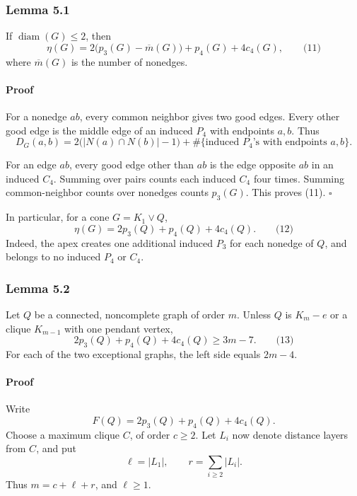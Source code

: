 \documentclass[
  11pt,
  a4paper,
]{article}
\newcounter{none} %
\begin{document}
\subsubsection{Lemma 5.1}\label{lemma-5.1}

If \(\operatorname{diam}(G)\le2\), then \[
\eta(G)
=
2\bigl(p_3(G)-\overline m(G)\bigr)
+p_4(G)+4c_4(G),
\qquad\text{(11)}
\] where \(\overline m(G)\) is the number of nonedges.

\paragraph{Proof}\label{proof-5}

For a nonedge \(ab\), every common neighbor gives two good edges. Every
other good edge is the middle edge of an induced \(P_4\) with endpoints
\(a,b\). Thus \[
D_G(a,b)
=
2\bigl(|N(a)\cap N(b)|-1\bigr)
+\#\{\text{induced \(P_4\)'s with endpoints \(a,b\)}\}.
\]

For an edge \(ab\), every good edge other than \(ab\) is the edge
opposite \(ab\) in an induced \(C_4\). Summing over pairs counts each
induced \(C_4\) four times. Summing common-neighbor counts over nonedges
counts \(p_3(G)\). This proves (11). \(\square\)

In particular, for a cone \(G=K_1\vee Q\), \[
\boxed{\eta(G)=2p_3(Q)+p_4(Q)+4c_4(Q).}
\qquad\text{(12)}
\] Indeed, the apex creates one additional induced \(P_3\) for each
nonedge of \(Q\), and belongs to no induced \(P_4\) or \(C_4\).

\subsubsection{Lemma 5.2}\label{lemma-5.2}

Let \(Q\) be a connected, noncomplete graph of order \(m\). Unless \(Q\)
is \(K_m-e\) or a clique \(K_{m-1}\) with one pendant vertex, \[
2p_3(Q)+p_4(Q)+4c_4(Q)\ge3m-7.
\qquad\text{(13)}
\] For each of the two exceptional graphs, the left side equals
\(2m-4\).

\paragraph{Proof}\label{proof-6}

Write \[
F(Q)=2p_3(Q)+p_4(Q)+4c_4(Q).
\] Choose a maximum clique \(C\), of order \(c\ge2\). Let \(L_i\) now
denote distance layers from \(C\), and put \[
\ell=|L_1|,
\qquad
r=\sum_{i\ge2}|L_i|.
\] Thus \(m=c+\ell+r\), and \(\ell\ge1\).
\end{document}
